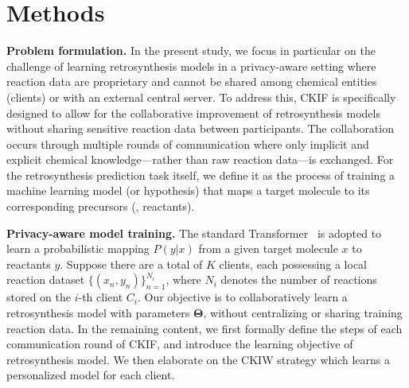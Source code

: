 \section{Methods}\label{sec:met}

\textbf{Problem formulation.}
In the present study, we focus in particular on the challenge of learning retrosynthesis models in a privacy-aware setting where reaction data are proprietary and cannot be shared among chemical entities (clients) or with an external central server. To address this, CKIF is specifically designed to allow for the collaborative improvement of retrosynthesis models without sharing sensitive reaction data between participants. The collaboration occurs through multiple rounds of communication where only implicit and explicit chemical knowledge---rather than raw reaction data---is exchanged. For the retrosynthesis prediction task itself, we define it as the process of training a machine learning model (or hypothesis) that maps a target molecule to its corresponding precursors (\ie, reactants).


\noindent\textbf{Privacy-aware model training.} 
The standard Transformer~\citep{vaswani2017attention} is adopted to learn a probabilistic mapping $P(y \vert x)$ from a given target molecule $x$ to reactants $y$. Suppose there are a total of $K$ clients, each possessing a local reaction dataset $\{(x_n, y_n)\}_{n=1}^{N_i}$, where $N_i$ denotes the number of reactions stored on the $i$-th client $C_i$. Our objective is to collaboratively learn a retrosynthesis model with parameters $\bm{\Theta}$, without centralizing or sharing training reaction data. In the remaining content, we first formally define the steps of each communication round of CKIF, and introduce the learning objective of retrosynthesis model. We then elaborate on the CKIW strategy which learns a personalized model for each client.

